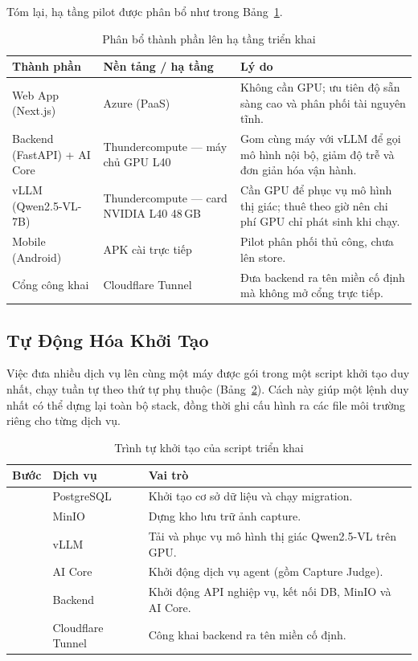 Tóm lại, hạ tầng pilot được phân bổ như trong Bảng~\ref{tab:infra}.

\begin{table}[H]
\centering
\caption{Phân bổ thành phần lên hạ tầng triển khai}
\label{tab:infra}
\begin{tabularx}{\textwidth}{>{\raggedright\arraybackslash}p{3.6cm} >{\raggedright\arraybackslash}p{3.4cm} X}
\toprule
\textbf{Thành phần} & \textbf{Nền tảng / hạ tầng} & \textbf{Lý do} \\
\midrule
Web App (Next.js) & Azure (PaaS) & Không cần GPU; ưu tiên độ sẵn sàng cao và phân phối tài nguyên tĩnh. \\
Backend (FastAPI) + AI Core & Thundercompute --- máy chủ GPU L40 & Gom cùng máy với vLLM để gọi mô hình nội bộ, giảm độ trễ và đơn giản hóa vận hành. \\
vLLM (Qwen2.5-VL-7B) & Thundercompute --- card NVIDIA L40 48\,GB & Cần GPU để phục vụ mô hình thị giác; thuê theo giờ nên chi phí GPU chỉ phát sinh khi chạy. \\
Mobile (Android) & APK cài trực tiếp & Pilot phân phối thủ công, chưa lên store. \\
Cổng công khai & Cloudflare Tunnel & Đưa backend ra tên miền cố định mà không mở cổng trực tiếp. \\
\bottomrule
\end{tabularx}
\end{table}

\subsection{Tự Động Hóa Khởi Tạo}
\contrib

Việc đưa nhiều dịch vụ lên cùng một máy được gói trong một script khởi
tạo duy nhất, chạy tuần tự theo thứ tự phụ thuộc
(Bảng~\ref{tab:deploy_steps}). Cách này giúp một lệnh duy nhất có thể
dựng lại toàn bộ stack, đồng thời ghi cấu hình ra các file môi trường
riêng cho từng dịch vụ.

\begin{table}[H]
\centering
\caption{Trình tự khởi tạo của script triển khai}
\label{tab:deploy_steps}
\begin{tabularx}{\textwidth}{>{\raggedright\arraybackslash}p{0.9cm} >{\raggedright\arraybackslash}p{3.2cm} X}
\toprule
\textbf{Bước} & \textbf{Dịch vụ} & \textbf{Vai trò} \\
\midrule
1 & PostgreSQL & Khởi tạo cơ sở dữ liệu và chạy migration. \\
2 & MinIO & Dựng kho lưu trữ ảnh capture. \\
3 & vLLM & Tải và phục vụ mô hình thị giác Qwen2.5-VL trên GPU. \\
4 & AI Core & Khởi động dịch vụ agent (gồm Capture Judge). \\
5 & Backend & Khởi động API nghiệp vụ, kết nối DB, MinIO và AI Core. \\
6 & Cloudflare Tunnel & Công khai backend ra tên miền cố định. \\
\bottomrule
\end{tabularx}
\end{table}

